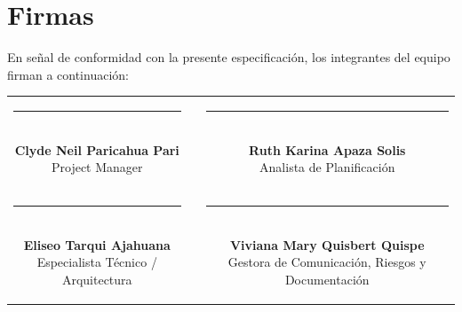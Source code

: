 \documentclass[11pt,a4paper]{article}
\begin{document}
\section{Firmas}
\noindent En señal de conformidad con la presente especificación, los integrantes del equipo firman a continuación:

\vspace{1.5cm}
\begin{center}
\begin{tabular}{c c c}
    \parbox{6.5cm}{\centering \rule{6.0cm}{0.6pt}\\[5pt] \textbf{Clyde Neil Paricahua Pari}\\[2pt] {\footnotesize Project Manager}}
    & \hspace{0.8cm} &
    \parbox{6.5cm}{\centering \rule{6.0cm}{0.6pt}\\[5pt] \textbf{Ruth Karina Apaza Solis}\\[2pt] {\footnotesize Analista de Planificación}}
    \\[2.0cm]
    \parbox{6.5cm}{\centering \rule{6.0cm}{0.6pt}\\[5pt] \textbf{Eliseo Tarqui Ajahuana}\\[2pt] {\footnotesize Especialista Técnico / Arquitectura}}
    & \hspace{0.8cm} &
    \parbox{6.5cm}{\centering \rule{6.0cm}{0.6pt}\\[5pt] \textbf{Viviana Mary Quisbert Quispe}\\[2pt] {\footnotesize Gestora de Comunicación, Riesgos y Documentación}}
\end{tabular}
\end{center}
\end{document}

